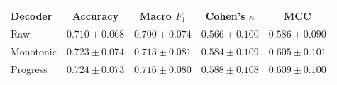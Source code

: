 \begin{tabular}{lcccc}
\toprule
Decoder & Accuracy & Macro $F_1$ & Cohen's $\kappa$ & MCC \\
\midrule
Raw & $0.710 \pm 0.068$ & $0.700 \pm 0.074$ & $0.566 \pm 0.100$ & $0.586 \pm 0.090$ \\
Monotonic & $0.723 \pm 0.074$ & $0.713 \pm 0.081$ & $0.584 \pm 0.109$ & $0.605 \pm 0.101$ \\
Progress & $0.724 \pm 0.073$ & $0.716 \pm 0.080$ & $0.588 \pm 0.108$ & $0.609 \pm 0.100$ \\
\bottomrule
\end{tabular}